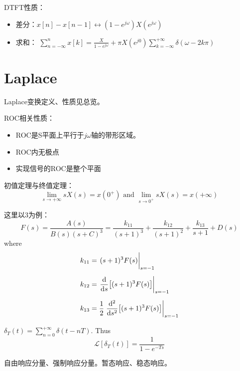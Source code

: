 \documentclass{article}
\def\suminf#1{\sum_{#1=-\infty}^{+\infty}}
\def\lt{\mathcal{L}}
\begin{document}
\begin{prt}DTFT性质：
	\begin{itemize}
		\item 差分：$x[n]-x[n-1]\longleftrightarrow(1-e^{j\omega})X(e^{j\omega})$
		\item 求和：
			$
			\displaystyle\sum_{n=-\infty}^nx[k]=\frac{X}{1-e^{j\omega}}+\pi X(e^{j0})\suminf{k}\delta(\omega-2k\pi)
			$
	\end{itemize}
\end{prt}





\section{Laplace}
Laplace变换定义、性质见总览。
\begin{prt}ROC相关性质：
	\begin{itemize}
		\item ROC是S平面上平行于$j\omega$轴的带形区域。
		\item ROC内无极点
		\item 实现信号的ROC是整个平面
	\end{itemize}
\end{prt}

\begin{thm}初值定理与终值定理：
    \[
		\lim_{s\to+\infty}sX(s)=x(0^+)
		\mbox{ and }
		\lim_{s\to 0^+}sX(s)=x(+\infty)
	\]
\end{thm}
\newpage
\begin{thm}[部分分式展开法]这里以3为例：
    \[
		F(s)=\frac{A(s)}{B(s)(s+C)^3}=
		\frac{k_{11}}{(s+1)^3}+\frac{k_{12}}{(s+1)^2}
		+\frac{k_{13}}{s+1}+D(s)
    \] where
	\[
		\begin{aligned}
			k_{11}&=\eval{(s+1)^3F(s)}_{s=-1}
			\\[5pt]
			k_{12}&=\eval{\dv{s}\qty[(s+1)^3F(s)]}_{s=-1}
			\\[5pt]
			k_{13}&=\frac{1}{2}
			\eval{\dv[2]{s}\qty[(s+1)^3F(s)]}_{s=-1}
		\end{aligned}
	\] 
\end{thm}



\begin{prt}[DiracComb函数]
	$\delta_T(t)=\sum_{n=0}^{+\infty}\delta(t-nT)$. Thus 
	\[
		\lt[\delta_T(t)]=\frac{1}{1-e^{-Ts}}
	\] 
\end{prt}

\begin{defi}
    自由响应分量、强制响应分量。暂态响应、稳态响应。
\end{defi}
\end{document}
